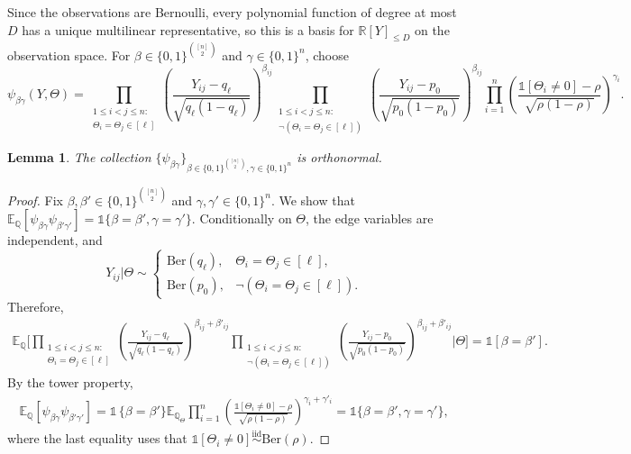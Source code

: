\documentclass[11pt, letterpaper]{article}
\newtheorem{lemma}[theorem]{Lemma}
\numberwithin{equation}{section}
\newcommand{\E}{\mathbb{E}}
\newcommand{\QQ}{\mathbb{Q}}
\begin{document}
Since the observations are Bernoulli, every polynomial function of degree at most $D$ has a unique multilinear representative, so this is a basis for $\mathbb R[Y]_{\le D}$ on the observation space.
For $\beta \in \{0,1\}^{\binom{[n]}{2}} $ and $\gamma\in\{0,1\}^n$, choose
{\small\begin{equation}\label{eq:psi-PDS}
\psi_{\beta \gamma}(Y,\Theta)=\prod_{\substack{1\leq i<j\leq n:\\ \Theta_i=\Theta_j\in [\ell]}}\left(\frac{Y_{ij}-q_\ell}{\sqrt{q_\ell(1-q_\ell)}}\right)^{\beta_{ij}}\prod_{\substack{1\leq i<j\leq n:\\ \neg(\Theta_i=\Theta_j\in[\ell])}}\left(\frac{Y_{ij}-p_0}{\sqrt{p_0(1-p_0)}}\right)^{\beta_{ij}}\prod_{i=1}^n \left(\frac{\mathds{1}{[\Theta_i\neq 0]}-\rho}{\sqrt{\rho(1-\rho)}}\right)^{\gamma_i}.
\end{equation}}
\begin{lemma}\label{lem:orthornormal-psi:PDS}
The collection $\{\psi_{\beta\gamma}\}_{\beta \in \{0,1\}^{\binom{[n]}{2}},\gamma\in \{0,1\}^n}$ is orthonormal.
\end{lemma}
\begin{proof}
    Fix $\beta,\beta' \in \{0,1\}^{\binom{[n]}{2}}$ and $\gamma,\gamma' \in \{0,1\}^n$. We show that $\E_\QQ[\psi_{\beta\gamma}\psi_{\beta'\gamma'}]=\mathds{1}\{\beta=\beta',\gamma=\gamma'\}$. Conditionally on $\Theta$, the edge variables are independent, and 
    \[Y_{ij}|\Theta \sim \begin{cases}
        \mathrm{Ber}(q_\ell), & \Theta_i=\Theta_j \in [\ell],\\
        \mathrm{Ber}(p_0), & \neg(\Theta_i=\Theta_j\in[\ell]).
    \end{cases}\]
Therefore,
\begin{align*}
    \E_\QQ\Bigg[\prod_{\substack{1\leq i<j\leq n:\\ \Theta_i=\Theta_j\in [\ell]}}\left(\frac{Y_{ij}-q_\ell}{\sqrt{q_\ell(1-q_\ell)}}\right)^{\beta_{ij}+\beta'_{ij}}\!\!\!\!\!\!\!\prod_{\substack{1\leq i<j\leq n:\\ \neg(\Theta_i=\Theta_j\in[\ell])}}\left(\frac{Y_{ij}-p_0}{\sqrt{p_0(1-p_0)}}\right)^{\beta_{ij}+\beta'_{ij}} \Bigg| \Theta\Bigg]=\mathds{1}[\beta=\beta'].
\end{align*}
By the tower property, 
\begin{align*}
    \E_\QQ[\psi_{\beta\gamma}\psi_{\beta'\gamma'}]=\mathds{1}\,\{\beta=\beta'\} \E_{ \QQ_\Theta}\prod_{i=1}^n \left(\frac{\mathds{1}[\Theta_i\neq 0]-\rho}{\sqrt{\rho(1-\rho)}}\right)^{\gamma_i+\gamma'_i}=\mathds 1 \{\beta=\beta',\gamma=\gamma'\},
\end{align*}
where the last equality uses that $\mathds 1 [\Theta_i\neq 0]\overset{\mathrm{iid}}{\sim} \mathrm{Ber}(\rho)$.
    \end{proof}
\end{document}
